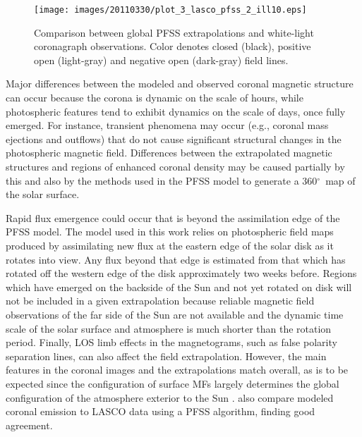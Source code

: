 \documentclass[namedreferences]{solarphysics}
\newcommand{\degr}{\ensuremath{^\circ}}
\begin{document}
\begin{article}
\begin{landscape}
\begin{figure}
\begin{center}
\texttt{[image: images/20110330/plot\_3\_lasco\_pfss\_2\_ill10.eps]}
\end{center}
\caption{Comparison between global PFSS extrapolations and white-light coronagraph observations. Color denotes closed (black), positive open (light-gray) and negative open (dark-gray) field lines.}\label{plot_3_lasco_pfss}
\end{figure}
\end{landscape}


Major differences between the modeled and observed coronal magnetic structure can occur because the corona is dynamic on the scale of hours, while photospheric features tend to exhibit dynamics on the scale of days, once fully emerged. For instance, transient phenomena may occur (e.g., coronal mass ejections and outflows) that do not cause significant structural changes in the photospheric magnetic field. Differences between the extrapolated magnetic structures and regions of enhanced coronal density may be caused partially by this and also by the methods used in the PFSS model to generate a 360\degr\ map of the solar surface. 

Rapid flux emergence could occur that is beyond the assimilation edge of the PFSS model. The model used in this work relies on photospheric field maps produced by assimilating new flux at the eastern edge of the solar disk as it rotates into view. Any flux beyond that edge is estimated from that which has rotated off the western edge of the disk approximately two weeks before. Regions which have emerged on the backside of the Sun and not yet rotated on disk will not be included in a given extrapolation because reliable magnetic field observations of the far side of the Sun are not available and the dynamic time scale of the solar surface and atmosphere is much shorter than the rotation period. Finally, LOS limb effects in the magnetograms, such as false polarity separation lines, can also affect the field extrapolation.
However, the main features in the coronal images and the extrapolations match overall, as is to be expected since the configuration of surface MFs largely determines the global configuration of the atmosphere exterior to the Sun \citep{Schrijver:2003}. \citet{Wang:2009} also compare modeled coronal emission to LASCO data using a PFSS algorithm, finding good agreement.


\end{article}
\end{document}
